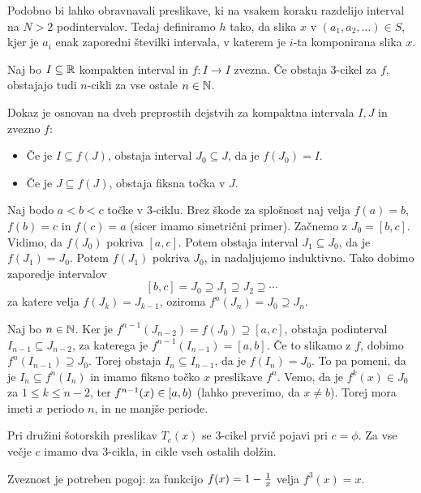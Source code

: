 Podobno bi lahko obravnavali preslikave, ki na vsakem koraku razdelijo interval
na $N > 2$ podintervalov.
Tedaj definiramo $h$ tako, da slika $x$ v $(a_1, a_2, \ldots) \in S$, kjer je
$a_i$ enak zaporedni številki intervala, v katerem je $i$-ta komponirana slika
$x$.


\begin{izrek}
  Naj bo $I \subseteq \mathbb{R}$ kompakten interval in $f: I \to I$ zvezna.
  Če obstaja $3$-cikel za $f$, obstajajo tudi $n$-cikli za vse ostale $n \in
  \mathbb{N}$.
\end{izrek}

Dokaz je osnovan na dveh preprostih dejstvih za kompaktna intervala $I, J$ in
zvezno $f$:
\begin{itemize}
\item Če je $I \subseteq f(J)$, obstaja interval $J_0 \subseteq J$, da je
  $f(J_0) = I$.
\item Če je $J \subseteq f(J)$, obstaja fiksna točka v $J$.
\end{itemize}

Naj bodo $a < b < c$ točke v $3$-ciklu.
Brez škode za splošnost naj velja $f(a) = b$, $f(b) = c$ in $f(c) = a$ (sicer
imamo simetrični primer).
Začnemo z $J_0 = [b,c]$.
Vidimo, da $f(J_0)$ pokriva $[a,c]$.
Potem obstaja interval $J_1 \subseteq J_0$, da je $f(J_1) = J_0$.
Potem $f(J_1)$ pokriva $J_0$, in nadaljujemo induktivno.
Tako dobimo zaporedje intervalov
\[
  [b, c] = J_0 \supseteq J_1 \supseteq J_2 \supseteq \cdots
\]
za katere velja $f(J_k) = J_{k-1}$, oziroma $f^n(J_n) = J_0 \supseteq J_n$.

Naj bo $n \in \mathbb{N}$.
Ker je $f^{n-1}(J_{n-2}) = f(J_0) \supseteq [a,c]$, obstaja podinterval $I_{n-1}
\subseteq J_{n-2}$, za katerega je $f^{n-1}(I_{n-1}) = [a,b]$.
Če to slikamo z $f$, dobimo $f^n(I_{n-1}) \supseteq J_0$.
Torej obstaja $I_n \subseteq I_{n-1}$, da je $f(I_n) = J_0$.
To pa pomeni, da je $I_n \subseteq f^n(I_n)$ in imamo fiksno točko $x$
preslikave $f^n$.
Vemo, da je $f^k(x) \in J_0$ za $1 \le k \le n-2$, ter $f^{n-1}(x) \in
\left[a,b\right)$ (lahko preverimo, da $x \ne b$).
Torej mora imeti $x$ periodo $n$, in ne manjše periode.

\begin{primer}
  Pri družini šotorskih preslikav $T_c(x)$ se $3$-cikel prvič pojavi pri $c =
  \phi$.
  Za vse večje $c$ imamo dva $3$-cikla, in cikle vseh ostalih dolžin.
\end{primer}

\begin{primer}
  Zveznost je potreben pogoj: za funkcijo $f(x) = 1 - \frac{1}{x}$ velja $f^3(x) =
  x$.
\end{primer}

